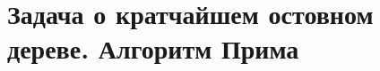 \documentclass[discrete.tex]{subfiles}
\begin{document}
\section{Задача о кратчайшем остовном дереве. Алгоритм Прима}
\end{document}
